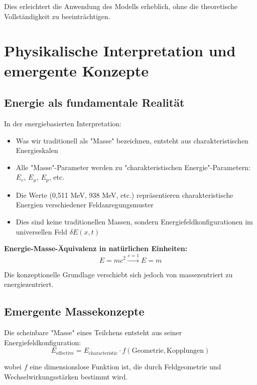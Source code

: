 \documentclass[12pt,a4paper]{report}
\begin{document}
	Dies erleichtert die Anwendung des Modells erheblich, ohne die theoretische Vollständigkeit zu beeinträchtigen.
	
	\section{Physikalische Interpretation und emergente Konzepte}
	\label{sec:physical_interpretation}
	
	\subsection{Energie als fundamentale Realität}
	\label{subsec:energy_fundamental}
	
	In der energiebasierten Interpretation:
	\begin{itemize}
		\item Was wir traditionell als "Masse" bezeichnen, entsteht aus charakteristischen Energieskalen
		\item Alle "Masse"-Parameter werden zu "charakteristischen Energie"-Parametern: $E_e$, $E_\mu$, $E_p$, etc.
		\item Die Werte (0,511 MeV, 938 MeV, etc.) repräsentieren charakteristische Energien verschiedener Feldanregungsmuster
		\item Dies sind keine traditionellen Massen, sondern Energiefeldkonfigurationen im universellen Feld $\delta E(x,t)$
	\end{itemize}
	
	\textbf{Energie-Masse-Äquivalenz in natürlichen Einheiten:}
	\begin{equation}
		E = mc^2 \xrightarrow{c=1} E = m
	\end{equation}
	
	Die konzeptionelle Grundlage verschiebt sich jedoch von massezentriert zu energiezentriert.
	
	\subsection{Emergente Massekonzepte}
	\label{subsec:emergent_mass}
	
	Die scheinbare "Masse" eines Teilchens entsteht aus seiner Energiefeldkonfiguration:
	\begin{equation}
		E_{\text{effective}} = E_{\text{characteristic}} \cdot f(\text{Geometrie}, \text{Kopplungen})
	\end{equation}
	
	wobei $f$ eine dimensionslose Funktion ist, die durch Feldgeometrie und Wechselwirkungsstärken bestimmt wird.
	
\end{document}
